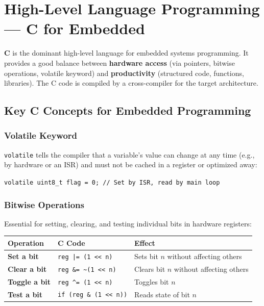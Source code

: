 \documentclass[12pt,a4paper]{article}
\renewcommand{\arraystretch}{1.45}
\begin{document}
\section{High-Level Language Programming --- C for Embedded}

\begin{tcolorbox}[defbox, title={\textbf{C Language for Embedded Systems}}]
\textbf{C} is the dominant high-level language for embedded systems programming. It provides a good balance between \textbf{hardware access} (via pointers, bitwise operations, volatile keyword) and \textbf{productivity} (structured code, functions, libraries). The C code is compiled by a cross-compiler for the target architecture.
\end{tcolorbox}

\subsection{Key C Concepts for Embedded Programming}

\subsubsection*{Volatile Keyword}
\texttt{volatile} tells the compiler that a variable's value can change at any time (e.g., by hardware or an ISR) and must not be cached in a register or optimized away:
\begin{center}
\texttt{volatile uint8\_t flag = 0; \quad // Set by ISR, read by main loop}
\end{center}

\subsubsection*{Bitwise Operations}
Essential for setting, clearing, and testing individual bits in hardware registers:

\par\noindent
{\renewcommand{\arraystretch}{1.55}%
\begin{tabularx}{\linewidth}{|B{3.0cm}|Y|Y|}
\hline
\textbf{Operation} & \textbf{C Code} & \textbf{Effect} \\
\hline
\textbf{Set a bit} & \texttt{reg |= (1 << n)} & Sets bit $n$ without affecting others \\
\hline
\textbf{Clear a bit} & \texttt{reg \&= \~{}(1 << n)} & Clears bit $n$ without affecting others \\
\hline
\textbf{Toggle a bit} & \texttt{reg \^{}= (1 << n)} & Toggles bit $n$ \\
\hline
\textbf{Test a bit} & \texttt{if (reg \& (1 << n))} & Reads state of bit $n$ \\
\hline
\end{tabularx}}
\end{document}
